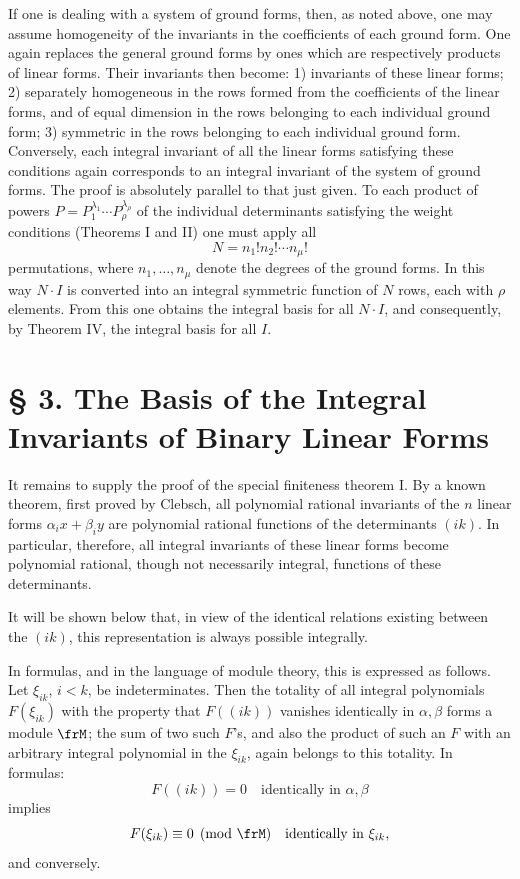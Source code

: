 \documentclass[11pt]{article}
\begin{document}
If one is dealing with a system of ground forms, then, as noted above, one may assume homogeneity of the invariants in the coefficients of each ground form. One again replaces the general ground forms by ones which are respectively products of linear forms. Their invariants then become: 1) invariants of these linear forms; 2) separately homogeneous in the rows formed from the coefficients of the linear forms, and of equal dimension in the rows belonging to each individual ground form; 3) symmetric in the rows belonging to each individual ground form. Conversely, each integral invariant of all the linear forms satisfying these conditions again corresponds to an integral invariant of the system of ground forms. The proof is absolutely parallel to that just given. To each product of powers \(P=P_1^{\lambda_1}\cdots P_\rho^{\lambda_\rho}\) of the individual determinants satisfying the weight conditions (Theorems I and II) one must apply all
\[
        N=n_1!n_2!\cdots n_\mu!
\]
permutations, where \(n_1,\ldots,n_\mu\) denote the degrees of the ground forms. In this way \(N\cdot I\) is converted into an integral symmetric function of \(N\) rows, each with \(\rho\) elements. From this one obtains the integral basis for all \(N\cdot I\), and consequently, by Theorem IV, the integral basis for all \(I\).

\setcounter{equation}{0}
\section*{§ 3. The Basis of the Integral Invariants of Binary Linear Forms}

It remains to supply the proof of the special finiteness theorem I. By a known theorem, first proved by Clebsch, all polynomial rational invariants of the \(n\) linear forms \(\alpha_i x+\beta_i y\) are polynomial rational functions of the determinants \((ik)\). In particular, therefore, all integral invariants of these linear forms become polynomial rational, though not necessarily integral, functions of these determinants.

It will be shown below that, in view of the identical relations existing between the \((ik)\), this representation is always possible integrally.

In formulas, and in the language of module theory, this is expressed as follows. Let \(\xi_{ik}\), \(i<k\), be indeterminates. Then the totality of all integral polynomials \(F(\xi_{ik})\) with the property that \(F((ik))\) vanishes identically in \(\alpha,\beta\) forms a module \(\frM\); the sum of two such \(F\)'s, and also the product of such an \(F\) with an arbitrary integral polynomial in the \(\xi_{ik}\), again belongs to this totality. In formulas:
\[
        F((ik))=0\quad \text{identically in \(\alpha,\beta\)}
\]
implies
\[
        F(\xi_{ik})\equiv0\pmod{\frM}\quad \text{identically in \(\xi_{ik}\)},
\]
and conversely.
\end{document}

